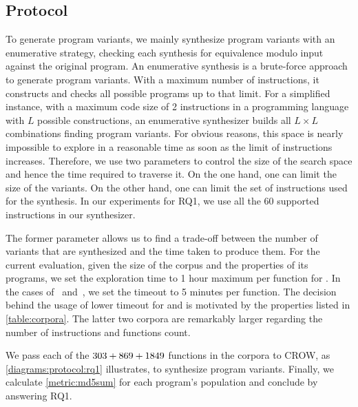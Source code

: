 \subsection*{Protocol}
To generate program variants, we mainly synthesize program variants with an enumerative strategy, checking each synthesis for equivalence modulo input \cite{Li2018} against the original program. An enumerative synthesis is a brute-force approach to generate program variants. With a maximum number of instructions, it constructs and checks all possible programs up to that limit. For a simplified instance, with a maximum code size of 2 instructions in a programming language with $L$ possible constructions, an enumerative synthesizer builds all $L\times L$ combinations finding program variants. For obvious reasons, this space is nearly impossible to explore in a reasonable time as soon as the limit of instructions increases.
Therefore, we use two parameters to control the size of the search space and hence the time required to traverse it.
On the one hand, one can limit the size of the variants. On the other hand, one can limit the set of instructions used for the synthesis. In our experiments for RQ1, we use all the $60$ supported instructions in our synthesizer.


The former parameter allows us to find a trade-off between the number of variants that are synthesized and the time taken to produce them. For the current evaluation, given the size of the corpus and the properties of its programs, we set the exploration time to 1 hour maximum per function for \corpusrosetta. In the cases of \corpussodium\ and\ \corpusqrcode, we set the timeout to 5 minutes per function. The decision behind the usage of lower timeout for \corpussodium
and \corpussodium is motivated by the properties listed in \autoref{table:corpora}. The latter two corpora are remarkably larger regarding the number of instructions and functions count. 

We pass each of the $303 + 869 + 1849$ functions in the corpora to CROW, as \autoref{diagrams:protocol:rq1} illustrates, to synthesize program variants. Finally, we calculate \autoref{metric:md5sum} for each program's population and conclude by answering RQ1.
